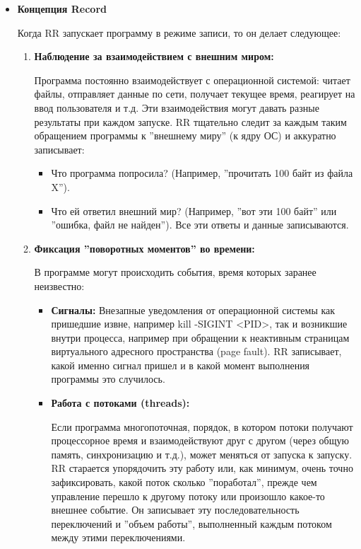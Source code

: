 \begin{itemize}

  \item \textbf{Концепция Record}
  
  Когда RR запускает программу в режиме записи, то он делает следующее:
    \begin{enumerate}
      \item \textbf{Наблюдение за взаимодействием с внешним миром:}

        Программа постоянно взаимодействует с операционной системой: читает файлы, отправляет
        данные по сети, получает текущее время, реагирует на ввод пользователя и т.д.
        Эти взаимодействия могут давать разные результаты при каждом запуске. RR
        тщательно следит за каждым таким обращением программы к ''внешнему миру'' (к ядру
        ОС) и аккуратно записывает: 
          \begin{itemize}
            \item Что программа попросила? (Например, ''прочитать 100 байт из файла X'').
            \item Что ей ответил внешний мир? (Например, ''вот эти 100 байт'' или ''ошибка, файл не найден'').
                  Все эти ответы и данные записываются.
          \end{itemize} 

      \item \textbf{Фиксация ''поворотных моментов'' во времени:}

      В программе могут происходить события, время которых заранее неизвестно:
      \begin{itemize} \item \textbf{Сигналы:} Внезапные уведомления от
      операционной системы как пришедшие извне, например kill -SIGINT <PID>,
      так и возникшие внутри процесса, например при обращении к неактивным
      страницам виртуального адресного пространства (page fault). RR записывает, какой
      именно сигнал пришел и в какой момент выполнения программы это случилось.

          \item \textbf{Работа с потоками (threads):} 

          Если программа многопоточная, порядок, в котором потоки получают процессорное время и взаимодействуют друг с другом 
          (через общую память, синхронизацию и т.д.), может меняться от запуска к запуску. RR старается упорядочить эту работу или, как минимум, 
          очень точно зафиксировать, какой поток сколько ''поработал'', прежде чем управление перешло к другому потоку или произошло
          какое-то внешнее событие. Он записывает эту последовательность переключений и ''объем работы'', выполненный каждым потоком между 
          этими переключениями.


\end{itemize}
\end{enumerate}
\end{itemize}
